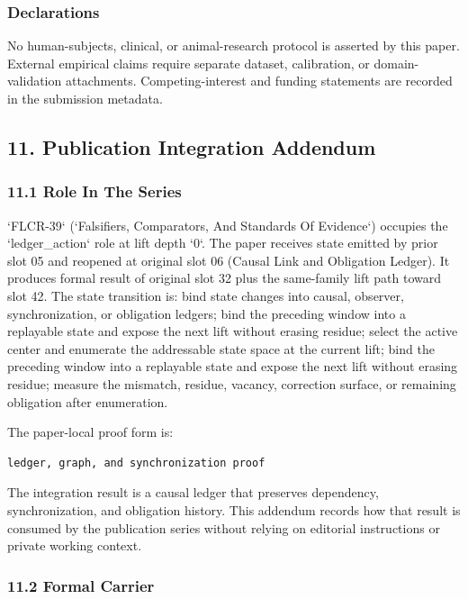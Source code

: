 \documentclass[11pt]{article}
\begin{document}
\subsubsection*{Declarations}

No human-subjects, clinical, or animal-research protocol is asserted by this
paper. External empirical claims require separate dataset, calibration, or
domain-validation attachments. Competing-interest and funding statements are recorded in the submission metadata.

\subsection*{11. Publication Integration Addendum}

\subsubsection*{11.1 Role In The Series}

`FLCR-39` (`Falsifiers, Comparators, And Standards Of Evidence`) occupies the `ledger\_action` role at lift depth `0`.
The paper receives state emitted by prior slot 05 and reopened at original slot 06 (Causal Link and Obligation Ledger). It produces formal result of original slot 32 plus the same-family lift path toward slot 42. The state transition is:
bind state changes into causal, observer, synchronization, or obligation ledgers; bind the preceding window into a replayable state and expose the next lift without erasing residue; select the active center and enumerate the addressable state space at the current lift; bind the preceding window into a replayable state and expose the next lift without erasing residue; measure the mismatch, residue, vacancy, correction surface, or remaining obligation after enumeration.

The paper-local proof form is:

\begin{verbatim}
ledger, graph, and synchronization proof
\end{verbatim}

The integration result is a causal ledger that preserves dependency, synchronization, and obligation history. This addendum records how that result is
consumed by the publication series without relying on editorial instructions or
private working context.

\subsubsection*{11.2 Formal Carrier}
\end{document}
